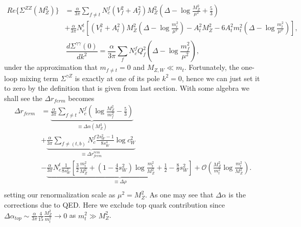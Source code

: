 \documentclass[secnumarabic, graphics,floatfix,nofootinbib,amsmath
tightenlines,nobibnotes,aps,prl,12pt]{revtex4-1}
\newcommand{\beeq}{\begin{equation}}
\newcommand{\eeeq}{\end{equation}}
\begin{document}
\beeq
\begin{split}
Re\{\Sigma^{ZZ}(M_Z^2)\}&=\frac{\alpha}{3\pi}\sum_{f\neq t} N_c^f(V_f^2+A_f^2)M_Z^2(\Delta-\log{\frac{M_Z^2}{\mu^2}}+\frac{5}{3})\\
                                        &+\frac{\alpha}{3 \pi}N_c^t[(V_t^2+A_t^2)M_Z^2(\Delta -\log{\frac{m_t^2}{\mu^2}})-A_t^2M_Z^2-6A_t^2m_t^2(\Delta-\log{\frac{m_t^2}{\mu^2}})],\\
\end{split}
\eeeq
\beeq
\frac{d\Sigma^{\gamma \gamma}(0)}{dk^2}=\frac{\alpha}{3 \pi}\sum_f N_c^f Q_f^2(\Delta-\log{\frac{m_f^2}{\mu^2}}),
\eeeq
under the approximation that $m_{f\neq t}=0$ and $M_{Z,W}\ll m_t$. Fortunately, the one-loop mixing term $\Sigma^{\gamma Z}$ is exactly at one of its pole $k^2=0$, hence we can just set it to zero by the definition that is given from last section. With some algebra we shall see the $\Delta r_{ferm}$ becomes
\beeq
\begin{split}
 \Delta r_{ferm}&=\underbrace{\frac{\alpha}{3\pi}\sum_{f\neq t}N_c^f (\log{\frac{M_Z^2}{m_f^2}}-\frac{5}{3})}_\text{$\equiv \Delta\alpha(M_Z^2)$}\\
 &+\underbrace{ \frac{\alpha}{3\pi} \sum_{f\neq (t,b)} N_c^f\frac{2s^2_W-1}{8s_W^4}\log{c_W^2}}_\text{$\equiv \Delta r^{rem}_{ferm}$}\\
 &-\underbrace{ \frac{\alpha}{3\pi} N_c^t\frac{1}{8s^2_W}[\frac{3}{2}\frac{m_t^2}{M_Z^2}+(1-\frac{4}{3}s^2_W)\log{\frac{m_t^2}{M_Z^2}}+\frac{1}{2}-\frac{8}{9}s^2_W]}_\text{$\equiv \Delta \rho$}+\mathcal{O}(\frac{M_Z^2}{m_t^2}\log{\frac{m_t^2}{M_Z^2}}).\\
\end{split}
\eeeq
setting our renormalization scale as $\mu^2=M_Z^2$. As one may see that $\Delta \alpha$ is the corrections due to QED. Here we exclude top quark contribution since $\Delta \alpha_{top}\sim \frac{\alpha}{3\pi}\frac{4}{15}\frac{M_Z^2}{m_t^2}\to 0$ as $m_t^2 \gg M_Z^2$.
\end{document}
